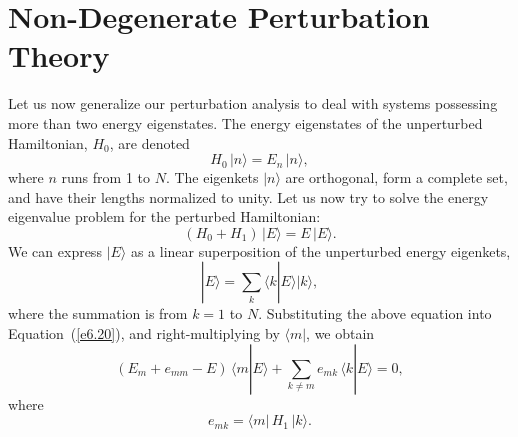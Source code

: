 \section{Non-Degenerate Perturbation Theory}\label{s6.3}
Let us now generalize our perturbation analysis to deal with systems
possessing  more than two energy eigenstates. The energy eigenstates of the
unperturbed Hamiltonian, $H_0$, are denoted
\begin{equation}
H_0\, |n\rangle = E_n\, |n\rangle,
\end{equation}
where $n$ runs from 1 to $N$. The eigenkets $|n\rangle$ are orthogonal,
form a complete set, and have their lengths normalized to unity. 
Let us now try to solve the energy eigenvalue
problem for the perturbed Hamiltonian:
\begin{equation}\label{e6.20}
(H_0 + H_1) \,|E\rangle = E\, |E\rangle.
\end{equation}
We can express $|E\rangle$ as a linear superposition of the unperturbed energy
eigenkets,
\begin{equation}
|E\rangle = \sum_k \langle k | E\rangle |k\rangle,
\end{equation}
where the summation is from $k=1$ to $N$. Substituting the above
equation into Equation~(\ref{e6.20}), and right-multiplying by $\langle m|$, we obtain
\begin{equation}\label{e6.22}
(E_m + e_{mm} - E)\, \langle m|E\rangle + \sum_{k\neq m} e_{mk}\, \langle k|E\rangle = 0,
\end{equation}
where
\begin{equation}
e_{mk} = \langle m |\,H_1\,| k\rangle.
\end{equation}

